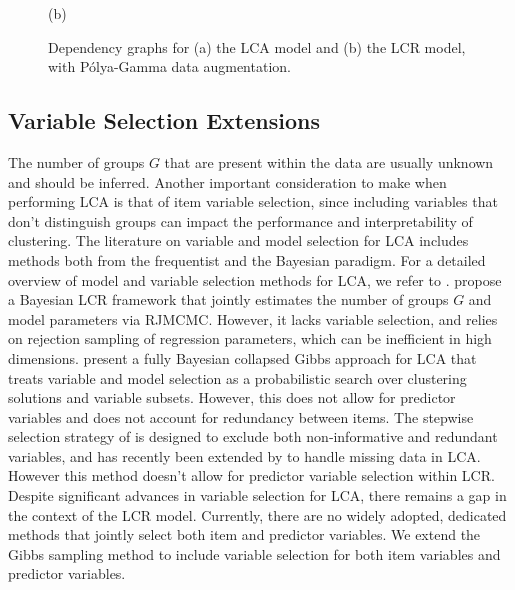 \documentclass[11pt]{article}
\theoremstyle{plain}
\theoremstyle{definition}
\begin{document}
\begin{figure}[htbp]
\begin{minipage}{0.48\textwidth}
        
        (b)
    \end{minipage}
    \caption{Dependency graphs for (a) the LCA model and (b) the LCR model, with Pólya-Gamma data augmentation. }
     \label{fig:graph}
\end{figure}
\subsection{Variable Selection Extensions}
The number of groups $G$ that are present within the data are usually unknown and should be inferred. Another important consideration to make when performing LCA is that of item variable selection, since including variables that don't distinguish groups can impact the performance and interpretability of clustering. The literature on variable and model selection for LCA includes methods both from the frequentist and the Bayesian paradigm. For a detailed overview of model and variable selection methods for LCA, we refer to \citet{fop_variable_2018}. 
\citet{pan_bayesian_2014} propose a Bayesian LCR framework that jointly estimates the number of groups $G$ and model parameters via RJMCMC. However, it lacks variable selection, and relies on rejection sampling of regression parameters, which can be inefficient in high dimensions.
\citet{white_bayesian_2016} present a fully Bayesian collapsed Gibbs approach for LCA that treats variable and model selection as a probabilistic search over clustering solutions and variable subsets. However, this does not allow for predictor variables and does not account for redundancy between items.
The stepwise selection strategy of \citet{fop_variable_2017} is designed to exclude both non‑informative and redundant variables, and has recently been extended by \citet{xu_variable_2024} to handle missing data in LCA. However this method doesn't allow for predictor variable selection within LCR. 
Despite significant advances in variable selection for LCA, there remains a gap in the context of the LCR model. Currently, there are no widely adopted, dedicated methods that jointly select both item and predictor variables. We extend the Gibbs sampling method to include variable selection for both item variables and predictor variables. 
\end{document}
